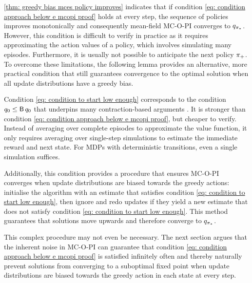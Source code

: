 \autoref{thm: greedy bias mces policy improves} indicates that if condition \eqref{eq: condition approach below e mcopi proof} holds at every step, the sequence of policies improves monotonically and consequently mean-field MC-O-PI converges to $q_{{\pi}_*}$.
However, this condition is difficult to verify in practice
as it requires approximating the action values of a policy, which involves simulating many episodes.
Furthermore, it is usually not possible to anticipate the next policy $\pi_+$.
To overcome these limitations, the following lemma provides an alternative, more practical condition that still guarantees convergence to the optimal solution when all update distributions have a greedy bias.




Condition \eqref{eq: condition to start low enough} corresponds to the condition $q_0 \leq \operatorname{\mathsf{B}} q_0$ that underpins many contraction-based arguments \citep{Bertsekas2018AbstractProgramming}.
It is stronger than condition \eqref{eq: condition approach below e mcopi proof}, but cheaper to verify. Instead of averaging over complete episodes to approximate the value function, it only requires averaging over single-step simulations to estimate the immediate reward and next state. For MDPs with deterministic transitions, even a single simulation suffices.

Additionally, this condition provides a procedure that ensures MC-O-PI converges when update distributions are biased towards the greedy actions: initialise the algorithm with an estimate that satisfies condition \eqref{eq: condition to start low enough}, then ignore and redo updates if they yield a new estimate that does not satisfy condition \eqref{eq: condition to start low enough}.
This method guarantees that solutions move upwards and therefore
converge to $q_{{\pi}_*}$.

This complex procedure may not even be necessary.
The next section argues that the inherent noise in MC-O-PI can guarantee that condition \eqref{eq: condition approach below e mcopi proof} is satisfied infinitely often
and thereby naturally prevent solutions from converging to a suboptimal fixed point when update distributions are biased towards the greedy action in each state at every step.


